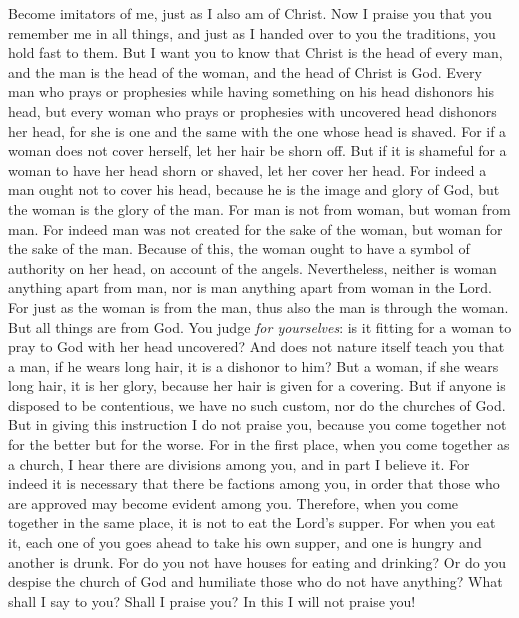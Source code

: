 \begin{biblechapter} %
 Become imitators of me, just as I also am of Christ.
\verse Now I praise you that you remember me in all things, and just as I handed over to you the traditions, you hold fast to them.
\verse But I want you to know that Christ is the head of every man, and the man is the head of the woman, and the head of Christ is God.
\verse Every man who prays or prophesies while having something on his head dishonors his head,
\verse but every woman who prays or prophesies with uncovered head dishonors her head, for she is one and the same with the one whose head is shaved.
\verse For if a woman does not cover herself, let her hair be shorn off. But if it is shameful for a woman to have her head shorn or shaved, let her cover her head.
\verse For indeed a man ought not to cover his head, because he is the image and glory of God, but the woman is the glory of the man.
\verse For man is not from woman, but woman from man.
\verse For indeed man was not created for the sake of the woman, but woman for the sake of the man.
\verse Because of this, the woman ought to have a symbol of authority on her head, on account of the angels.
\verse Nevertheless, neither is woman anything apart from man, nor is man anything apart from woman in the Lord.
\verse For just as the woman is from the man, thus also the man is through the woman. But all things are from God.
\verse You judge \textit{for yourselves}: is it fitting for a woman to pray to God with her head uncovered?
\verse And does not nature itself teach you that a man, if he wears long hair, it is a dishonor to him?
\verse But a woman, if she wears long hair, it is her glory, because her hair is given for a covering.
\verse But if anyone is disposed to be contentious, we have no such custom, nor do the churches of God.
 But in giving this instruction I do not praise you, because you come together not for the better but for the worse.
\verse For in the first place, when you come together as a church, I hear there are divisions among you, and in part I believe it.
\verse For indeed it is necessary that there be factions among you, in order that those who are approved may become evident among you.
\verse Therefore, when you come together in the same place, it is not to eat the Lord’s supper.
\verse For when you eat it, each one of you goes ahead to take his own supper, and one is hungry and another is drunk.
\verse For do you not have houses for eating and drinking? Or do you despise the church of God and humiliate those who do not have anything? What shall I say to you? Shall I praise you? In this I will not praise you!

\end{biblechapter}
